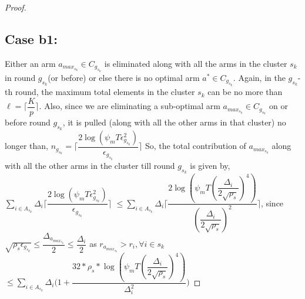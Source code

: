 \begin{proof}
\subsection{Case b1:} 
Either an arm $a_{max_{s_{k}}}\in C_{g_{s_{k}}}$ is eliminated along with all the arms in the cluster $s_{k}$ in round $g_{s_{k}}$(or before) or else there is no optimal arm $a^{*}\in C_{g_{s_{k}}}$. Again, in the $g_{s_{k}}$-th round, the maximum total elements in the cluster $s_{k}$ can be no more than $\ell=\bigg\lceil \dfrac{K}{p}\bigg\rceil$.
\newline
Also, since we are eliminating a sub-optimal arm $a_{max_{s_{k}}}\in C_{g_{s_{k}}}$ on or before round $g_{s_{k}}$, it is pulled (along with all the other arms in that cluster) no longer than,
\newline
\hspace*{4em}$n_{g_{s_{k}}}=\bigg\lceil\dfrac{2\log{(\psi_{m}T\epsilon_{g_{s_{k}}}^{2})}}{\epsilon_{g_{s_{k}}}}\bigg\rceil$
\newline
So, the total contribution of $a_{max_{s_{k}}}$  along with all the other arms in the cluster till round $g_{s_{k}}$ is given by,
\newline
\hspace*{3em}$\sum_{i\in A_{s_{k}}}\Delta_{i}\bigg\lceil\dfrac{2\log{(\psi_{m}T\epsilon_{g_{s_{k}}}^{2})}}{\epsilon_{g_{s_{k}}}}\bigg\rceil$
$\leq\sum_{i\in A_{s_{k}}}\Delta_{i}\bigg\lceil\dfrac{2\log{(\psi_{m}T(\dfrac{\Delta_{i}}{2\sqrt{\rho_{s}}})^{4})}}{(\dfrac{\Delta_{i}}{2\sqrt{\rho_{s}}})^{2}}\bigg\rceil$, since $\sqrt{\rho_{s}\epsilon_{g_{s_{k}}}}\leq\dfrac{\Delta_{a_{max_{s_{k}}}}}{2}\leq  \dfrac{\Delta_{i}}{2}$ as ${r}_{a_{max_{s_{k}}}}>{r}_{i},\forall i\in s_{k}$
\newline
\hspace*{12em}$\leq\sum_{i\in A_{s_{k}}}\Delta_{i}\bigg(1+\dfrac{32*\rho_{s}*\log{(\psi_{m}T(\dfrac{\Delta_{i}}{2\sqrt{\rho_{s}}})^{4})}}{\Delta_{i}^{2}}\bigg)$

\end{proof}
